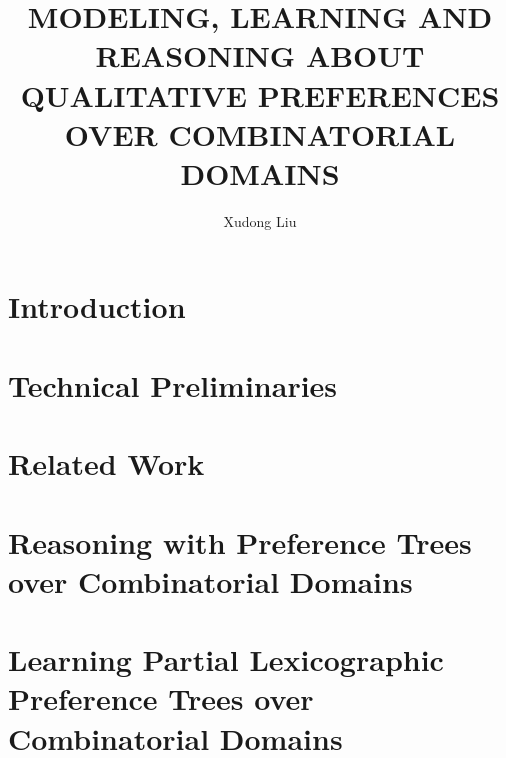 \documentclass[final]{ukthesis}
\begin{document}
\author{Xudong Liu}
\title{MODELING, LEARNING AND REASONING ABOUT QUALITATIVE PREFERENCES OVER COMBINATORIAL DOMAINS}
\abstract{}
\frontmatter
\maketitle
\begin{acknowledgments}
	
\end{acknowledgments}
\begin{dedication}
	
\end{dedication}
\tableofcontents\clearpage
\listoffigures\clearpage
\listoftables\clearpage
\mainmatter

\chapter{Introduction\label{ch:intro}}

\copyrightnotice

\chapter{Technical Preliminaries\label{ch:preliminary}}

\copyrightnotice

\chapter{Related Work\label{ch:relwork}}

\copyrightnotice

\chapter{Reasoning with Preference Trees over Combinatorial Domains\label{ch:PTrees}}

\copyrightnotice

\chapter{Learning Partial Lexicographic Preference Trees over Combinatorial Domains\label{ch:learningPLPT}}

\copyrightnotice
\end{document}
